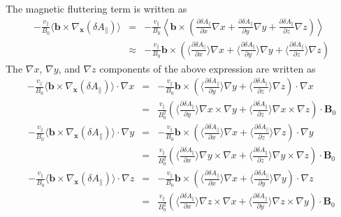 \documentclass{article}
\begin{document}
The magnetic fluttering term is written as
\begin{eqnarray*}
  - \frac{v_{\parallel}}{B_0} \langle \mathbf{b} \times \nabla_{\mathbf{x}}
  (\delta A_{\parallel}) \rangle & = & - \frac{v_{\parallel}}{B_0}
  \left\langle \mathbf{b} \times \left( \frac{\partial \delta
  A_{\parallel}}{\partial x} \nabla x + \frac{\partial \delta
  A_{\parallel}}{\partial y} \nabla y + \frac{\partial \delta
  A_{\parallel}}{\partial z} \nabla z \right) \right\rangle\\
  & \approx & - \frac{v_{\parallel}}{B_0} \mathbf{b} \times \left( \langle
  \frac{\partial \delta A_{\parallel}}{\partial x} \rangle \nabla x + \langle
  \frac{\partial \delta A_{\parallel}}{\partial y} \rangle \nabla y + \langle
  \frac{\partial \delta A_{\parallel}}{\partial z} \rangle \nabla z \right)
\end{eqnarray*}
The $\nabla x$, $\nabla y$, and $\nabla z$ components of the above expression
are written as
\begin{eqnarray}
  - \frac{v_{\parallel}}{B_0} \langle \mathbf{b} \times \nabla_{\mathbf{x}}
  (\delta A_{\parallel}) \rangle \cdot \nabla x & = & -
  \frac{v_{\parallel}}{B_0} \mathbf{b} \times \left( \langle \frac{\partial
  \delta A_{\parallel}}{\partial y} \rangle \nabla y + \langle \frac{\partial
  \delta A_{\parallel}}{\partial z} \rangle \nabla z \right) \cdot \nabla x
  \nonumber\\
  & = & \frac{v_{\parallel}}{B_0^2} \left( \langle \frac{\partial \delta
  A_{\parallel}}{\partial y} \rangle \nabla x \times \nabla y + \langle
  \frac{\partial \delta A_{\parallel}}{\partial z} \rangle \nabla x \times
  \nabla z \right) \cdot \mathbf{B}_0 
\end{eqnarray}
\begin{eqnarray}
  - \frac{v_{\parallel}}{B_0} \langle \mathbf{b} \times \nabla_{\mathbf{x}}
  (\delta A_{\parallel}) \rangle \cdot \nabla y & = & -
  \frac{v_{\parallel}}{B_0} \mathbf{b} \times \left( \langle \frac{\partial
  \delta A_{\parallel}}{\partial x} \rangle \nabla x + \langle \frac{\partial
  \delta A_{\parallel}}{\partial z} \rangle \nabla z \right) \cdot \nabla y
  \nonumber\\
  & = & \frac{v_{\parallel}}{B_0^2} \left( \langle \frac{\partial \delta
  A_{\parallel}}{\partial x} \rangle \nabla y \times \nabla x + \langle
  \frac{\partial \delta A_{\parallel}}{\partial z} \rangle \nabla y \times
  \nabla z \right) \cdot \mathbf{B}_0 
\end{eqnarray}
\begin{eqnarray}
  - \frac{v_{\parallel}}{B_0} \langle \mathbf{b} \times \nabla_{\mathbf{x}}
  (\delta A_{\parallel}) \rangle \cdot \nabla z & = & -
  \frac{v_{\parallel}}{B_0} \mathbf{b} \times \left( \langle \frac{\partial
  \delta A_{\parallel}}{\partial x} \rangle \nabla x + \langle \frac{\partial
  \delta A_{\parallel}}{\partial y} \rangle \nabla y \right) \cdot \nabla z
  \nonumber\\
  & = & \frac{v_{\parallel}}{B_0^2} \left( \langle \frac{\partial \delta
  A_{\parallel}}{\partial x} \rangle \nabla z \times \nabla x + \langle
  \frac{\partial \delta A_{\parallel}}{\partial y} \rangle \nabla z \times
  \nabla y \right) \cdot \mathbf{B}_0 
\end{eqnarray}
\end{document}

